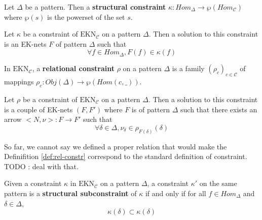 \begin{defn}
    Let $\Delta$ be a pattern. Then a \textbf{structural constraint} $\kappa :Hom_\Delta \rightarrow \wp(Hom_\mathcal{C})$  where $\wp(s)$ is the powerset of the set $s$\label{nomencl:pow-set}.
\end{defn}

\begin{defn}
    \label{def:struct-constr}
    Let $\kappa$ be a constraint of $\text{EKN}_\mathcal{C}$ on a pattern $\Delta$. Then a solution to this constraint is an EK-nets $F$ of pattern $\Delta$ such that
    $$ \forall f \in Hom_\Delta, F(f)\in \kappa(f)$$
\end{defn}

\begin{defn}
    In $\text{EKN}_\mathcal{C}$, a \textbf{relational constraint} $\rho$ on a pattern $\Delta$ is a family
    $(\rho_c)_{c\in\mathcal{C}}$
    of mappings $\rho_c : Obj(\Delta) \rightarrow \wp(Hom(c,\_))$.
\end{defn}


\begin{defn}
    \label{def:rel-constr}
    Let $\rho$ be a constraint of $\text{EKN}_\mathcal{C}$ on a pattern $\Delta$. Then a solution to this constraint is a couple of EK-nets $(F,F')$ where $F$ is of pattern $\Delta$ such that there exists an arrow $\big<N,\nu\big> : F\rightarrow F'$ such that
    $$\forall \delta \in \Delta, \nu_\delta \in \rho_{F(\delta)}(\delta)$$
\end{defn}

\begin{rem}
    So far, we cannot say we defined a proper relation that would make the Definifition \ref{def:rel-constr} correspond to the standard definition of constraint.
    TODO : deal with that.
\end{rem}


\begin{defn}
    Given a constraint $\kappa$ in $\text{EKN}_\mathcal{C}$ on a pattern $\Delta$, a constraint $\kappa'$ on the same pattern is a \textbf{structural subconstraint} of $\kappa$ if and only if for all $f\in Hom_\Delta$ and $\delta\in\Delta$,
    $$\kappa(\delta)\subset\kappa(\delta)$$
\end{defn}

